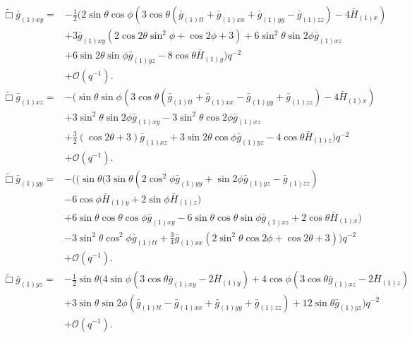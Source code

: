 \documentclass[12pt]{iopart} %
\begin{document}
\begin{eqnarray}\label{eqn:efexy}
\tilde{\Box}\bar{g}_{(1)xy}=&-\frac{1}{2} (2 \sin \theta  \cos \phi  (3 \cos \theta (\bar{g}_{(1)tt}+\bar{g}_{(1)xx}+\bar{g}_{(1)yy}-\bar{g}_{(1)zz})-4 \bar{H}_{(1) x}) \nonumber \\
&+3 \bar{g}_{(1)xy} (2 \cos 2\theta  \sin ^2\phi +\cos 2 \phi +3)+6 \sin ^2\theta  \sin 2 \phi 
   \bar{g}_{(1)xz} \nonumber \\
   &+6 \sin 2 \theta  \sin \phi  \bar{g}_{(1)yz}-8 \cos
   \theta  \bar{H}_{(1) y})    q^{-2} \nonumber \\
&+\mathcal{O}(q^{-1}).
\end{eqnarray}
\begin{eqnarray}\label{eqn:efexz}
\tilde{\Box}\bar{g}_{(1)xz}=&- (\sin \theta  \sin \phi  (3 \cos \theta  (\bar{g}_{(1)tt}+\bar{g}_{(1)xx}-\bar{g}_{(1)yy}+\bar{g}_{(1)zz})-4
   \bar{H}_{(1) x}) \nonumber \\
   &+3 \sin ^2\theta \sin 2 \phi  \bar{g}_{(1)xy}-3 \sin
   ^2\theta  \cos 2 \phi  \bar{g}_{(1)xz} \nonumber \\
   &+\frac{3}{2} (\cos 2 \theta +3)
   \bar{g}_{(1)xz}+3 \sin 2 \theta  \cos \phi  \bar{g}_{(1)yz}-4 \cos
   \theta  \bar{H}_{(1)z})    q^{-2} \nonumber \\
&+\mathcal{O}(q^{-1}).
\end{eqnarray}
\begin{eqnarray}\label{eqn:efeyy}
\tilde{\Box}\bar{g}_{(1)yy}=&-( (\sin \theta (3 \sin \theta  (2 \cos ^2\phi  \bar{g}_{(1)yy}+\sin 2 \phi  \bar{g}_{(1)yz}-\bar{g}_{(1)zz}) \nonumber \\
&-6 \cos\phi \bar{H}_{(1) y}+2 \sin \phi  \bar{H}_{(1) z}) \nonumber \\
&+6 \sin \theta \cos
   \theta \cos \phi  \bar{g}_{(1)xy}-6 \sin \theta  \cos \theta  \sin   \phi  \bar{g}_{(1)xz}+2 \cos \theta  \bar{H}_{(1) x}) \nonumber \\
   &-3 \sin ^2\theta \cos ^2\phi  \bar{g}_{(1)tt}+\frac{3}{4} \bar{g}_{(1)xx} (2 \sin ^2\theta  \cos 2 \phi +\cos 2 \theta +3)  )  q^{-2} \nonumber \\
&+\mathcal{O}(q^{-1}).
\end{eqnarray}
\begin{eqnarray}\label{eqn:efeyz}
\tilde{\Box}\bar{g}_{(1)yz}=&-\frac{1}{2} \sin \theta (4 \sin \phi  (3 \cos \theta  \bar{g}_{(1)xy}-2 \bar{H}_{(1) y})+4 \cos \phi  (3 \cos \theta  \bar{g}_{(1)xz}-2 \bar{H}_{(1) z}) \nonumber \\
&+3 \sin \theta  \sin 2 \phi  (\bar{g}_{(1)tt}-\bar{g}_{(1)xx}+\bar{g}_{(1)yy}+\bar{g}_{(1)zz})+12 \sin \theta  \bar{g}_{(1)yz})  q^{-2} \nonumber \\
&+\mathcal{O}(q^{-1}).
\end{eqnarray}
\end{document}
